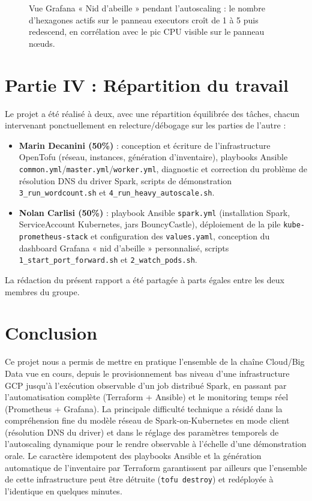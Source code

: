 \documentclass{name}
\begin{document}
\begin{figure}[H]
    \centering
    \fbox{\rule{0.9\textwidth}{0pt}\rule{0pt}{6cm}}
    \caption{Vue Grafana « Nid d'abeille » pendant l'autoscaling : le nombre d'hexagones actifs sur le panneau executors croît de 1 à 5 puis redescend, en corrélation avec le pic CPU visible sur le panneau nœuds.}
    \label{fig:autoscale-grafana}
\end{figure}

\section{Partie IV : Répartition du travail}

Le projet a été réalisé à deux, avec une répartition équilibrée des tâches, chacun intervenant ponctuellement en relecture/débogage sur les parties de l'autre :

\begin{itemize}
    \item \textbf{Marin Decanini (50\%)} : conception et écriture de l'infrastructure OpenTofu (réseau, instances, génération d'inventaire), playbooks Ansible \texttt{common.yml}/\texttt{master.yml}/\texttt{worker.yml}, diagnostic et correction du problème de résolution DNS du driver Spark, scripts de démonstration \texttt{3\_run\_wordcount.sh} et \texttt{4\_run\_heavy\_autoscale.sh}.
    \item \textbf{Nolan Carlisi (50\%)} : playbook Ansible \texttt{spark.yml} (installation Spark, ServiceAccount Kubernetes, jars BouncyCastle), déploiement de la pile \texttt{kube-prometheus-stack} et configuration des \texttt{values.yaml}, conception du dashboard Grafana « nid d'abeille » personnalisé, scripts \texttt{1\_start\_port\_forward.sh} et \texttt{2\_watch\_pods.sh}.
\end{itemize}

La rédaction du présent rapport a été partagée à parts égales entre les deux membres du groupe.

\section{Conclusion}

Ce projet nous a permis de mettre en pratique l'ensemble de la chaîne Cloud/Big Data vue en cours, depuis le provisionnement bas niveau d'une infrastructure GCP jusqu'à l'exécution observable d'un job distribué Spark, en passant par l'automatisation complète (Terraform + Ansible) et le monitoring temps réel (Prometheus + Grafana). La principale difficulté technique a résidé dans la compréhension fine du modèle réseau de Spark-on-Kubernetes en mode client (résolution DNS du driver) et dans le réglage des paramètres temporels de l'autoscaling dynamique pour le rendre observable à l'échelle d'une démonstration orale. Le caractère idempotent des playbooks Ansible et la génération automatique de l'inventaire par Terraform garantissent par ailleurs que l'ensemble de cette infrastructure peut être détruite (\texttt{tofu destroy}) et redéployée à l'identique en quelques minutes.
\end{document}
